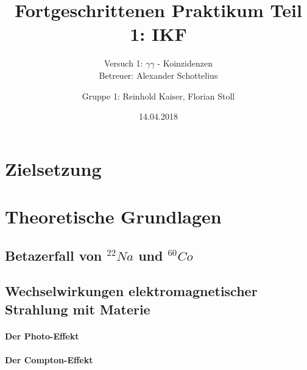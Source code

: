 \documentclass[11pt]{scrartcl}
\title{Fortgeschrittenen Praktikum Teil 1: IKF}
\subtitle{Versuch 1: $\gamma \gamma$ - Koinzidenzen \\ Betreuer: Alexander Schottelius}
\author{Gruppe 1: Reinhold Kaiser, Florian Stoll}
\date{14.04.2018}
\begin{document}
\maketitle
\newpage
\tableofcontents
\newpage


\section{Zielsetzung}


\section{Theoretische Grundlagen}

\subsection{Betazerfall von $^{22}Na$ und $^{60}Co$}

\subsection{Wechselwirkungen elektromagnetischer Strahlung mit Materie}

\paragraph{Der Photo-Effekt}



\paragraph{Der Compton-Effekt}
\end{document}
